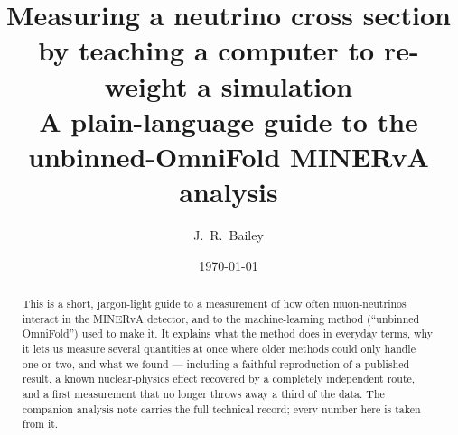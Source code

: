 \documentclass[11pt]{article}
\title{Measuring a neutrino cross section by teaching a computer to
re-weight a simulation\\[4pt]
\large A plain-language guide to the unbinned-OmniFold MINERvA analysis}
\author{J.~R.~Bailey}
\date{\today}
\begin{document}
\maketitle

\begin{abstract}
This is a short, jargon-light guide to a measurement of how often
muon-neutrinos interact in the MINERvA detector, and to the machine-learning
method (``unbinned OmniFold'') used to make it. It explains what the method
does in everyday terms, why it lets us measure several quantities at once where
older methods could only handle one or two, and what we found --- including a
faithful reproduction of a published result, a known nuclear-physics effect
recovered by a completely independent route, and a first measurement that no
longer throws away a third of the data. The companion analysis note carries the
full technical record; every number here is taken from it.
\end{abstract}



\printbibliography
\end{document}
